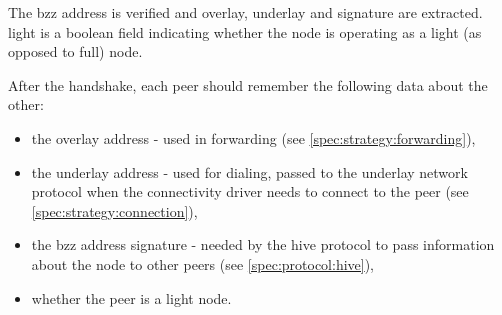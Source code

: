 The bzz address is verified and overlay, underlay and signature are extracted.
light is a boolean field indicating whether the node is operating as a light (as opposed to full) node.

After the handshake,  each peer should remember the following data about the other:

\begin{itemize}
    \item the overlay address - used in forwarding  (see  \ref{spec:strategy:forwarding}),
    \item the underlay address - used for dialing, passed to the underlay network protocol when the connectivity driver needs to connect to the peer (see \ref{spec:strategy:connection}),
    \item the bzz address signature - needed by the hive protocol to pass information about the node to other peers (see \ref{spec:protocol:hive}),
    \item whether the peer is a light node.
\end{itemize}


